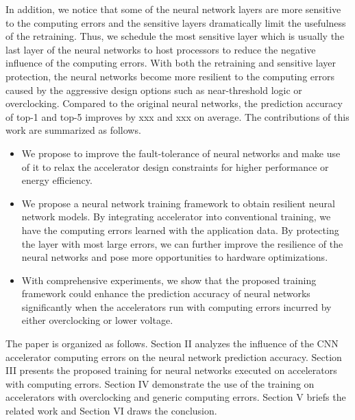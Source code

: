 In addition, we notice that some of the neural network layers are more sensitive to the 
computing errors and the sensitive layers dramatically limit the usefulness of the retraining. 
Thus, we schedule the most sensitive layer which is usually the last 
layer of the neural networks to host processors to reduce the negative influence 
of the computing errors. With both the retraining and sensitive layer protection, 
the neural networks become more resilient to the computing errors caused by 
the aggressive design options such as near-threshold logic or overclocking.
Compared to the original neural networks, the prediction accuracy of top-1 and top-5 
improves by xxx and xxx on average. The contributions of this work are 
summarized as follows.

\begin{itemize}
	\item We propose to improve the fault-tolerance of neural networks and make use of it to relax 
		the accelerator design constraints for higher performance or energy efficiency.

	\item We propose a neural network training framework to obtain resilient neural network models. 
		By integrating accelerator into conventional training, we have the computing errors 
		learned with the application data. By protecting the layer with most large errors, 
		we can further improve the resilience of the neural networks and pose more 
		opportunities to hardware optimizations.

	\item With comprehensive experiments, we show that the proposed training framework 
		could enhance the prediction accuracy of neural networks significantly 
		when the accelerators run with computing errors incurred by either 
		overclocking or lower voltage.
\end{itemize}
The paper is organized as follows. Section II analyzes the influence of 
the CNN accelerator computing errors on the neural network prediction accuracy. 
Section III presents the proposed training for neural networks executed on accelerators with computing errors.
Section IV demonstrate the use of the training on accelerators with overclocking and generic computing errors. 
Section V briefs the related work and Section VI draws the conclusion. 


